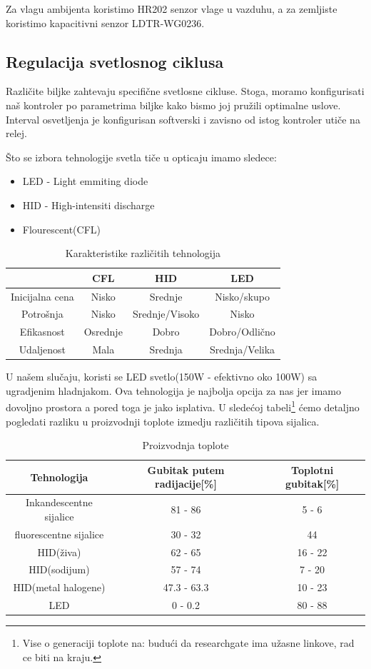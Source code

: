 \documentclass[a4paper,11pt]{book}
\begin{document}
Za vlagu ambijenta koristimo HR202 senzor vlage u vazduhu, a za zemljiste koristimo kapacitivni senzor LDTR-WG0236.

\subsection{Regulacija svetlosnog ciklusa}
Različite biljke zahtevaju specifične svetlosne cikluse. Stoga, moramo konfigurisati naš kontroler po parametrima biljke kako bismo joj pružili optimalne uslove. Interval osvetljenja je konfigurisan softverski i zavisno od istog kontroler utiče na relej. 

Što se izbora tehnologije svetla tiče u opticaju imamo sledece:

\hrulefill
\begin{itemize}
  \item LED - Light emmiting diode
  \item HID - High-intensiti discharge
  \item Flourescent(CFL)
\end{itemize}
\hrulefill

\begin{table}[ht]
  \caption{Karakteristike različitih tehnologija}
  \begin{tabular}{|c|c|c|c|}
  \hline
   & CFL & HID & LED \\ \hline
  Inicijalna cena & Nisko & Srednje & Nisko/skupo \\ \hline
  Potrošnja & Nisko & Srednje/Visoko & Nisko \\ \hline
  Efikasnost & Osrednje & Dobro & Dobro/Odlično \\ \hline
  Udaljenost & Mala & Srednja & Srednja/Velika \\ \hline
  \end{tabular}
\end{table}

U našem slučaju, koristi se LED svetlo(150W - efektivno oko 100W) sa ugradjenim hladnjakom. Ova tehnologija je najbolja opcija za nas jer imamo dovoljno prostora a pored toga je jako isplativa. U sledećoj tabeli\footnote{Vise o generaciji toplote na: budući da researchgate ima užasne linkove, rad ce biti na kraju.} ćemo detaljno pogledati razliku u proizvodnji toplote izmedju različitih tipova sijalica.

\begin{table}[ht]
  \caption{Proizvodnja toplote}
  \begin{tabular}{|c|c|c|}
  \hline
    Tehnologija & Gubitak putem radijacije[\%] & Toplotni gubitak[\%] \\ \hline
  Inkandescentne sijalice & 81 - 86 & 5 - 6 \\ \hline
  fluorescentne sijalice & 30 - 32 & 44 \\ \hline
  HID(živa) & 62 - 65 & 16 - 22 \\ \hline
  HID(sodijum) & 57 - 74 & 7 - 20 \\ \hline
  HID(metal halogene) & 47.3 - 63.3 & 10 - 23 \\ \hline
  LED & 0 - 0.2 & 80 - 88 \\ \hline
  \end{tabular}
\end{table}
\end{document}
